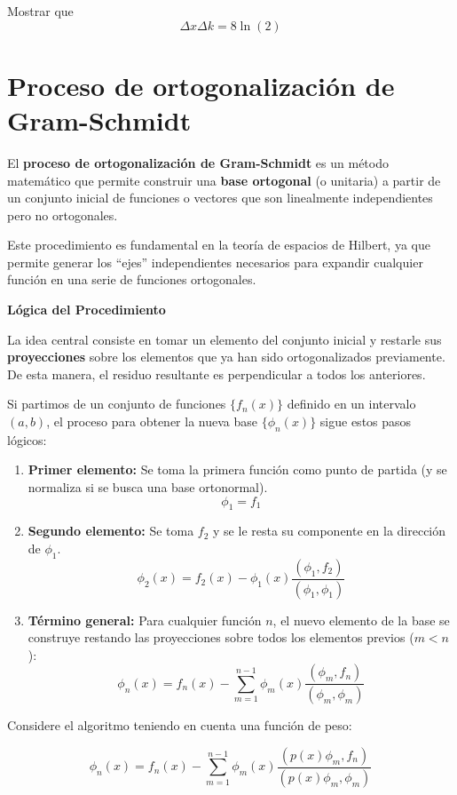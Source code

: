 \documentclass[a4paper]{article}
\begin{document}
Mostrar que $$\Delta x \Delta k = 8\ln(2)$$

\section{Proceso de ortogonalización de Gram-Schmidt}

El \textbf{proceso de ortogonalización de Gram-Schmidt} es un método matemático que permite construir una \textbf{base ortogonal} (o unitaria) a partir de un conjunto inicial de funciones o vectores que son linealmente independientes pero no ortogonales.

Este procedimiento es fundamental en la teoría de espacios de Hilbert, ya que permite generar los ``ejes'' independientes necesarios para expandir cualquier función en una serie de funciones ortogonales.

\textbf{Lógica del Procedimiento}

La idea central consiste en tomar un elemento del conjunto inicial y restarle sus \textbf{proyecciones} sobre los elementos que ya han sido ortogonalizados previamente. De esta manera, el residuo resultante es perpendicular a todos los anteriores.

Si partimos de un conjunto de funciones $\{f_n(x)\}$ definido en un intervalo $(a, b)$, el proceso para obtener la nueva base $\{\phi_n(x)\}$ sigue estos pasos lógicos:

\begin{enumerate}
    \item \textbf{Primer elemento:} Se toma la primera función como punto de partida (y se normaliza si se busca una base ortonormal).
    $$\phi_1 = f_1$$
    
    \item \textbf{Segundo elemento:} Se toma $f_2$ y se le resta su componente en la dirección de $\phi_1$.
    $$\phi_2(x) = f_2(x) - \phi_1(x) \frac{(\phi_1, f_2)}{(\phi_1, \phi_1)}$$
    
    \item \textbf{Término general:} Para cualquier función $n$, el nuevo elemento de la base se construye restando las proyecciones sobre todos los elementos previos ($m < n$):
    $$\phi_n(x) = f_n(x) - \sum_{m=1}^{n-1} \phi_m(x) \frac{(\phi_m, f_n)}{(\phi_m, \phi_m)}$$
\end{enumerate}

Considere el algoritmo teniendo en cuenta una función de peso:

$$\phi_n(x) = f_n(x) - \sum_{m=1}^{n-1} \phi_m(x) \frac{(p(x) \phi_m, f_n)}{(p(x)\phi_m, \phi_m)}$$
\end{document}
